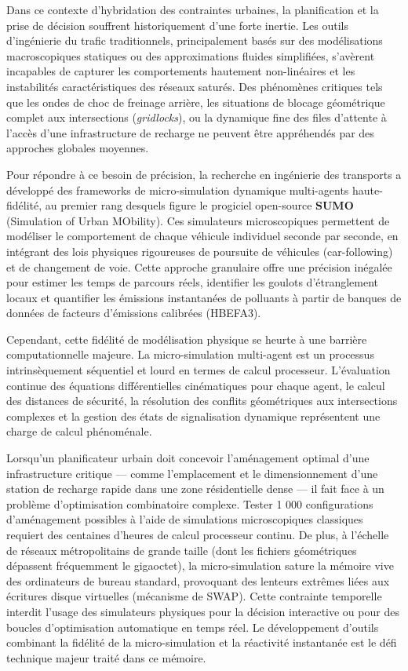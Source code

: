 \documentclass[10pt, a4paper]{article}
\begin{document}
Dans ce contexte d'hybridation des contraintes urbaines, la
planification et la prise de décision souffrent historiquement d'une
forte inertie. Les outils d'ingénierie du trafic traditionnels,
principalement basés sur des modélisations macroscopiques statiques ou
des approximations fluides simplifiées, s'avèrent incapables de capturer
les comportements hautement non-linéaires et les instabilités
caractéristiques des réseaux saturés. Des phénomènes critiques tels que
les ondes de choc de freinage arrière, les situations de blocage
géométrique complet aux intersections (\emph{gridlocks}), ou la
dynamique fine des files d'attente à l'accès d'une infrastructure de
recharge ne peuvent être appréhendés par des approches globales
moyennes.

Pour répondre à ce besoin de précision, la recherche en ingénierie des
transports a développé des frameworks de micro-simulation dynamique
multi-agents haute-fidélité, au premier rang desquels figure le
progiciel open-source \textbf{SUMO} (Simulation of Urban MObility). Ces
simulateurs microscopiques permettent de modéliser le comportement de
chaque véhicule individuel seconde par seconde, en intégrant des lois
physiques rigoureuses de poursuite de véhicules (car-following) et de
changement de voie. Cette approche granulaire offre une précision
inégalée pour estimer les temps de parcours réels, identifier les
goulots d'étranglement locaux et quantifier les émissions instantanées
de polluants à partir de banques de données de facteurs d'émissions
calibrées (HBEFA3).

Cependant, cette fidélité de modélisation physique se heurte à une
barrière computationnelle majeure. La micro-simulation multi-agent est
un processus intrinsèquement séquentiel et lourd en termes de calcul
processeur. L'évaluation continue des équations différentielles
cinématiques pour chaque agent, le calcul des distances de sécurité, la
résolution des conflits géométriques aux intersections complexes et la
gestion des états de signalisation dynamique représentent une charge de
calcul phénoménale.

Lorsqu'un planificateur urbain doit concevoir l'aménagement optimal
d'une infrastructure critique --- comme l'emplacement et le
dimensionnement d'une station de recharge rapide dans une zone
résidentielle dense --- il fait face à un problème d'optimisation
combinatoire complexe. Tester 1 000 configurations d'aménagement
possibles à l'aide de simulations microscopiques classiques requiert des
centaines d'heures de calcul processeur continu. De plus, à l'échelle de
réseaux métropolitains de grande taille (dont les fichiers géométriques
dépassent fréquemment le gigaoctet), la micro-simulation sature la
mémoire vive des ordinateurs de bureau standard, provoquant des lenteurs
extrêmes liées aux écritures disque virtuelles (mécanisme de SWAP).
Cette contrainte temporelle interdit l'usage des simulateurs physiques
pour la décision interactive ou pour des boucles d'optimisation
automatique en temps réel. Le développement d'outils combinant la
fidélité de la micro-simulation et la réactivité instantanée est le défi
technique majeur traité dans ce mémoire.
\end{document}
